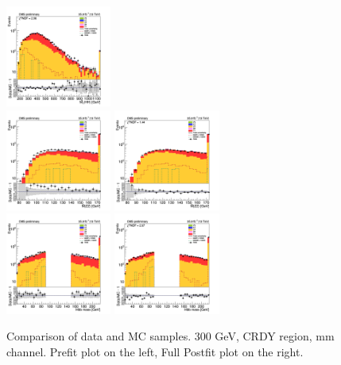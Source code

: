 \begin{figure}[tbp]
\begin{center}
    \includegraphics[width=0.31\textwidth]{figures/mm_300_april18/hhMt_mm_CRDY_FullPostfit_plot_apr18.png}\\
    \includegraphics[width=0.31\textwidth]{figures/mm_300_april18/hmass0_mm_CRDY_prefit_plot_apr18.png}
    \includegraphics[width=0.31\textwidth]{figures/mm_300_april18/hmass0_mm_CRDY_FullPostfit_plot_apr18.png}\\
    \includegraphics[width=0.31\textwidth]{figures/mm_300_april18/hmass1_mm_CRDY_prefit_plot_apr18.png}
    \includegraphics[width=0.31\textwidth]{figures/mm_300_april18/hmass1_mm_CRDY_FullPostfit_plot_apr18.png}\\
    \caption{Comparison of data and MC samples. 300 GeV, CRDY region, mm channel. Prefit plot on the left,           Full Postfit plot on the right.}
    \label{fig:MCcomparisons_mm_low_CRDY}
  \end{center}
\end{figure}

